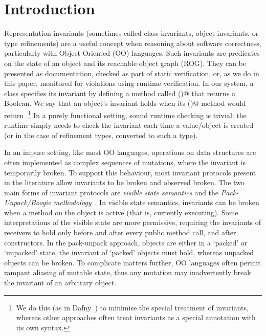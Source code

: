 \section{Introduction}
\label{s:intro}
Representation invariants (sometimes called class invariants, object invariants, or type refinements) are
a useful concept when reasoning about software correctness, particularly with Object Oriented (OO) languages. Such invariants are predicates on the state of an object and its reachable object graph (ROG).
They can be presented as documentation, checked as part of static verification, or, as we do in this paper, monitored for violations using runtime verification.
In our system, a class specifies its invariant by defining a method called \Q@invariant()@
that returns a Boolean.
We say that an object's invariant holds when its \Q@invariant()@ method would return \Q@true@.\footnote{We do this (as in Dafny~\cite{DBLP:conf/sigada/Leino12}) to minimise the special treatment of invariants, whereas other approaches often treat invariants as a special annotation with its own syntax.}
In a purely functional setting,  sound runtime checking is trivial: the runtime simply needs to check the invariant each time a value/object is created (or in the case of refinement types, converted to such a type).

In an impure setting, like most OO languages, 
operations on data structures are often implemented as complex sequences of mutations,
where the invariant is temporarily broken.
To support this behaviour, most invariant protocols present in the literature allow invariants to be broken and observed broken.
The two main forms of invariant protocols are \emph{visible state semantics} \cite{Meyer:1988:OSC:534929} and the \emph{Pack-Unpack/Boogie methodology}~\cite{DBLP:journals/jot/BarnettDFLS04}.
In visible state semantics, invariants can be broken when a method on the object is active (that is, currently executing).
Some interpretations of the visible state are more permissive, requiring the invariants of receivers to hold only before and after every public method call, and after constructors. 
In the pack-unpack approach, objects are either in a `packed' or `unpacked' state, 
the invariant of `packed' objects must hold, whereas unpacked objects can be broken.
To complicate matters further, OO languages often permit rampant aliasing of mutable state, thus any mutation may inadvertently break the invariant of an arbitrary object.

